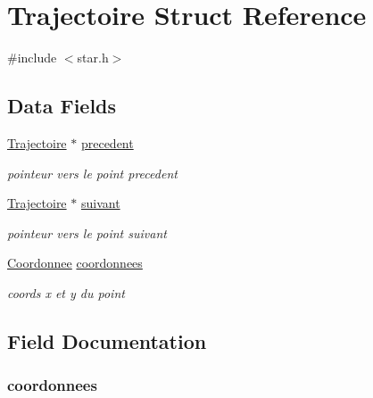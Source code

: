 \hypertarget{struct_trajectoire}{\section{Trajectoire Struct Reference}
\label{struct_trajectoire}
}


{\ttfamily \#include $<$star.\-h$>$}

\subsection*{Data Fields}
\begin{DoxyCompactItemize}
\item 
\hyperlink{struct_trajectoire}{Trajectoire} $\ast$ \hyperlink{struct_trajectoire_a3c1a423041539f8f86a4379cc76e00cb}{precedent}
\begin{DoxyCompactList}\small\item\em pointeur vers le point precedent \end{DoxyCompactList}\item 
\hyperlink{struct_trajectoire}{Trajectoire} $\ast$ \hyperlink{struct_trajectoire_a92979c948eb34c42da812423e2d758ee}{suivant}
\begin{DoxyCompactList}\small\item\em pointeur vers le point suivant \end{DoxyCompactList}\item 
\hyperlink{struct_coordonnee}{Coordonnee} \hyperlink{struct_trajectoire_a88d43117c876b9e8d3c1d94d02a82811}{coordonnees}
\begin{DoxyCompactList}\small\item\em coords x et y du point \end{DoxyCompactList}\end{DoxyCompactItemize}


\subsection{Field Documentation}
\hypertarget{struct_trajectoire_a88d43117c876b9e8d3c1d94d02a82811}{
\subsubsection[{coordonnees}]{ coordonnees}}\label{struct_trajectoire_a88d43117c876b9e8d3c1d94d02a82811}


